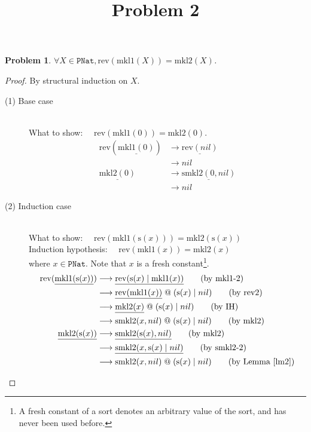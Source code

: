 \documentclass[12pt, a4paper]{article}
\title{Problem 2}
\date{\vspace{-5ex}}
\newtheorem{problem}{Problem}
\newcommand{\rel}[1]{\mathrel{#1}}
\newcommand{\rmx}[1]{\mathrm{#1}}
\newcommand{\larrow}{\longrightarrow}
\newcommand{\under}{\underline}
\begin{document}
\maketitle

\begin{problem}
$\forall X \in \mathtt{PNat}, \rmx{rev}(\rmx{mkl1}(X)) = \rmx{mkl2}(X)$.
\end{problem}
\begin{proof}
By structural induction on $X$.

\begin{description}

\item[(1) Base case]~\\
\noindent
What to show: $\quad\rmx{rev}(\rmx{mkl1}(0)) = \rmx{mkl2}(0)$.
\begin{align*}
\rmx{rev}(\under{\rmx{mkl1}(0)}) &\larrow \under{\rmx{rev}(nil)} \tag{by mkl1-1} \\
	&\larrow nil \tag{by rev1} \\
\under{\rmx{mkl2}(0)} &\larrow \under{\rmx{smkl2}(0, nil)} \tag{by mkl2} \\
	&\larrow nil \tag{by smkl2-1}
\end{align*}

\item[(2) Induction case]~\\
What to show: $\quad\rmx{rev}(\rmx{mkl1}(\rmx{s}(x))) = \rmx{mkl2}(\rmx{s}(x))$ \\
Induction hypothesis: $\quad \rmx{rev}(\rmx{mkl1}(x)) = \rmx{mkl2}(x)$ \\
where $x \in \mathtt{PNat}$. Note that $x$ is a fresh constant\footnote{A fresh constant of a sort denotes an arbitrary value of the sort, and has never been used before.}.
\begin{align*}
\rmx{rev}(\under{\rmx{mkl1}(\rmx{s}(x))}) 
	&\larrow \under{\rmx{rev}(\rmx{s}(x) \rel{|} \rmx{mkl1}(x))} \tag{by mkl1-2} \\
	&\larrow  \under{\rmx{rev}(\rmx{mkl1}(x))} \rel{@} (\rmx{s}(x) \rel{|} nil)  \tag{by rev2} \\
	&\larrow \under{\rmx{mkl2}(x)} \rel{@} (\rmx{s}(x) \rel{|} nil)  \tag{by IH} \\
	&\larrow \rmx{smkl2}(x, nil) \rel{@} (\rmx{s}(x) \rel{|} nil)  \tag{by mkl2} \\
\under{\rmx{mkl2}(\rmx{s}(x))} 
	&\larrow \under{\rmx{smkl2}(\rmx{s}(x), nil)} \tag{by mkl2} \\
	&\larrow \under{\rmx{smkl2}(x, \rmx{s}(x) \rel{|} nil)} \tag{by smkl2-2} \\
	&\larrow \rmx{smkl2}(x, nil) \rel{@} (\rmx{s}(x) \rel{|} nil) \tag{by Lemma~\ref{lm2}}
\end{align*}

\end{description}
\end{proof}
\end{document}
